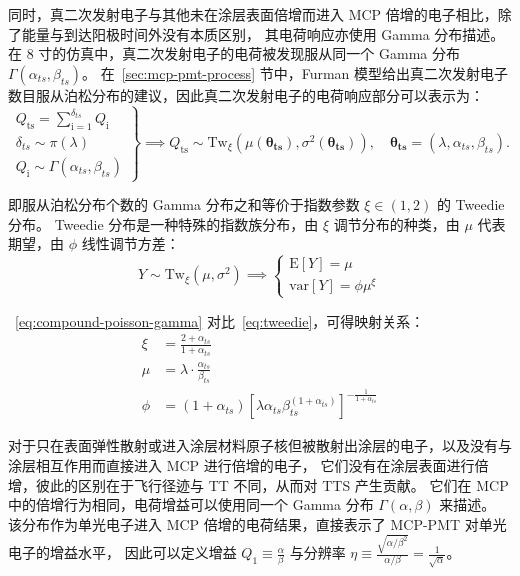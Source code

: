 同时，真二次发射电子与其他未在涂层表面倍增而进入 MCP 倍增的电子相比，除了能量与到达阳极时间外没有本质区别，
其电荷响应亦使用 Gamma 分布描述。在 8 寸的仿真中，真二次发射电子的电荷被发现服从同一个 Gamma 分布 $\Gamma(\alpha_{ts}, \beta_{ts})$。
在~\ref{sec:mcp-pmt-process} 节中，Furman 模型给出真二次发射电子数目服从泊松分布的建议，因此真二次发射电子的电荷响应部分可以表示为：
\begin{equation}
    \left.
        \begin{array}{c}
        Q_\mathrm{ts}=\sum_{\mathrm{i=1}}^{\delta_{ts}}Q_\mathrm{i}\\
        \delta_{ts}\sim\pi(\lambda)\\
        Q_\mathrm{i}\sim\Gamma(\alpha_{ts},\beta_{ts})
        \end{array}
    \right\}\implies
    Q_\mathrm{ts}\sim\mathrm{Tw}_{\xi}
    \left(\mu(\boldsymbol{\theta_{ts}}),\sigma^2(\boldsymbol{\theta_{ts}})\right),\quad
    \boldsymbol{\theta_{ts}}=(\lambda, \alpha_{ts},\beta_{ts}).
    \label{eq:compound-poisson-gamma}
\end{equation}

即服从泊松分布个数的 Gamma 分布之和等价于指数参数 $\xi\in(1, 2)$ 的 Tweedie 分布。
Tweedie 分布是一种特殊的指数族分布，由 $\xi$ 调节分布的种类，由 $\mu$ 代表期望，由 $\phi$ 线性调节方差：
\begin{equation}
    Y\sim\mathrm{Tw}_{\xi}(\mu, \sigma^2)\implies 
    \left\{
        \begin{array}{c}
        \mathrm{E}[Y]=\mu \\
        \mathrm{var}[Y]=\phi\mu^{\xi}
        \end{array}
    \right.
    \label{eq:tweedie}
\end{equation}

~\eqref{eq:compound-poisson-gamma} 对比~\eqref{eq:tweedie}，可得映射关系：
\begin{align}
    \xi & = \frac{2+\alpha_{ts}}{1+\alpha_{ts}}\\
    \mu & = \lambda\cdot\frac{\alpha_{ts}}{\beta_{ts}}\\
    \phi & = (1+\alpha_{ts})\left[\lambda\alpha_{ts}\beta_{ts}^{(1+\alpha_{ts})}\right]^{-\frac{1}{1+\alpha_{ts}}}
\end{align}

对于只在表面弹性散射或进入涂层材料原子核但被散射出涂层的电子，以及没有与涂层相互作用而直接进入 MCP 进行倍增的电子，
它们没有在涂层表面进行倍增，彼此的区别在于飞行径迹与 TT 不同，从而对 TTS 产生贡献。
它们在 MCP 中的倍增行为相同，电荷增益可以使用同一个 Gamma 分布 $\Gamma(\alpha, \beta)$ 来描述。
该分布作为单光电子进入 MCP 倍增的电荷结果，直接表示了 MCP-PMT 对单光电子的增益水平，
因此可以定义增益 $Q_1\equiv\frac{\alpha}{\beta}$ 与分辨率 $\eta\equiv\frac{\sqrt{\alpha/\beta^2}}{\alpha/\beta}=\frac{1}{\sqrt{\alpha}}$。

